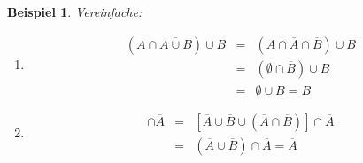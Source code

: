 \documentclass{report}
\newtheorem{myexample}{Beispiel}
\begin{document}
\begin{myexample}Vereinfache:
\begin{enumerate}
\item \begin{eqnarray}(A \cap \overline{A \cup B}) \cup B & = & (A \cap \overline{A} \cap \overline{B}) \cup B\\ \nonumber
& = & (\emptyset \cap \overline{B}) \cup B \\ \nonumber
& = & \emptyset \cup B = B
\end{eqnarray}
\item \begin{eqnarray}[\overline{A \cap B} \cup (\overline{A} \cap \overline{B})] \cap \overline{A} & = & [\overline{A} \cup \overline{B} \cup (\overline{A} \cap \overline{B})] \cap \overline{A} \\ \nonumber
& = & (\overline{A} \cup \overline{B}) \cap \overline{A} = \overline{A}
\end{eqnarray}
\end{enumerate}\end{myexample}
\end{document}
